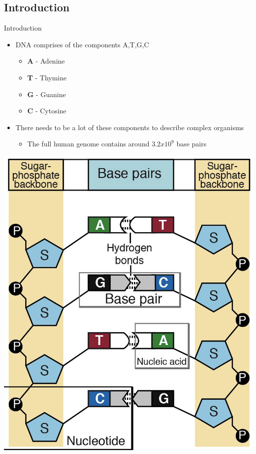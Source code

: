 \documentclass{beamer}
\begin{document}
    \subsection{Introduction}
    \begin{frame}{Introduction}
        \begin{itemize}
            \item DNA comprises of the components A,T,G,C
            \begin{itemize}
                \item \textbf{A} - Adenine
                \item \textbf{T} - Thymine
                \item \textbf{G} - Guanine
                \item \textbf{C} - Cytosine
            \end{itemize}
            \item There needs to be a lot of these components to describe complex organisms
            \begin{itemize}
                \item The full human genome contains around $3.2 x 10^9$ base pairs \cite[p.~4]{introgenomics}
            \end{itemize}
        \end{itemize}
        \centering
        \includegraphics[scale=0.1]{gene-base-pair.png}
    \end{frame}
    
\end{document}
